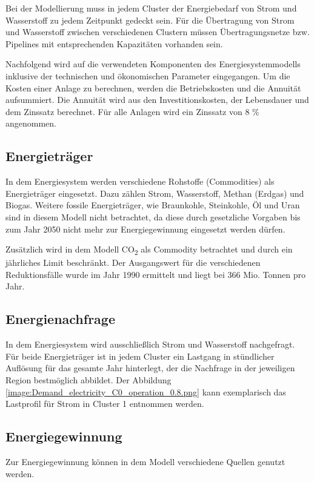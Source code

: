 Bei der Modellierung muss in jedem Cluster der Energiebedarf von Strom und Wasserstoff zu jedem Zeitpunkt gedeckt sein. Für die Übertragung von Strom und Wasserstoff zwischen verschiedenen Clustern müssen Übertragungsnetze bzw. Pipelines mit entsprechenden Kapazitäten vorhanden sein. 

Nachfolgend wird auf die verwendeten Komponenten des Energiesystemmodells inklusive der technischen und ökonomischen Parameter eingegangen. 
Um die Kosten einer Anlage zu berechnen, werden die Betriebskosten und die Annuität aufsummiert. Die Annuität wird aus den Investitionskosten, der Lebensdauer und dem Zinssatz berechnet. Für alle Anlagen wird ein Zinssatz von 8 \% angenommen.
 
\subsection{Energieträger}
In dem Energiesystem werden verschiedene Rohstoffe (Commodities) als Energieträger eingesetzt. Dazu zählen Strom, Wasserstoff, Methan (Erdgas) und Biogas. Weitere fossile Energieträger, wie Braunkohle, Steinkohle, Öl und Uran sind in diesem Modell nicht betrachtet, da diese durch gesetzliche Vorgaben bis zum Jahr 2050 nicht mehr zur Energiegewinnung eingesetzt werden dürfen. \cite{bund}

Zusätzlich wird in dem Modell CO\textsubscript{2} als Commodity betrachtet und durch ein jährliches Limit beschränkt. Der Ausgangswert für die verschiedenen Reduktionsfälle wurde im Jahr 1990 ermittelt und liegt bei 366 Mio. Tonnen pro Jahr.


\subsection{Energienachfrage}
In dem Energiesystem wird ausschließlich Strom und Wasserstoff nachgefragt. Für beide Energieträger ist in jedem Cluster ein Lastgang in stündlicher Auflösung für das gesamte Jahr hinterlegt, der die Nachfrage in der jeweiligen Region bestmöglich abbildet. Der Abbildung \ref{image:Demand_electricity_C0_operation_0.8.png} kann exemplarisch das Lastprofil für Strom in Cluster 1 entnommen werden. 


\subsection{Energiegewinnung}
Zur Energiegewinnung können in dem Modell verschiedene Quellen genutzt werden.

